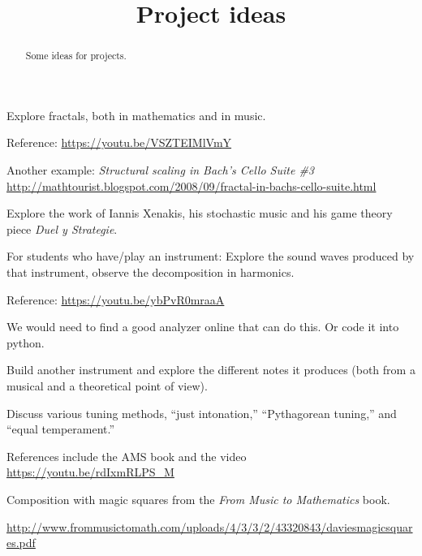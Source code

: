 \documentclass[12pt,noauthor,nooutcomes]{ximera}%
\author{}
\title{Project ideas}
\begin{document}
\begin{abstract}
    Some ideas for projects.
\end{abstract}
\maketitle

\begin{project}
Explore fractals, both in mathematics and in music.

Reference: \url{https://youtu.be/VSZTEIMlVmY}

Another example: \textit{Structural scaling in Bach's Cello Suite \#3} \url{http://mathtourist.blogspot.com/2008/09/fractal-in-bachs-cello-suite.html}
\end{project}

\begin{project}
Explore the work of Iannis Xenakis, his stochastic music and his game theory piece \textit{Duel y Strategie}.
\end{project}

\begin{project}
For students who have/play an instrument: Explore the sound waves produced by that instrument, observe the decomposition in harmonics.

Reference: \url{https://youtu.be/ybPvR0mraaA}

We would need to find a good analyzer online that can do this. Or code it into python.

\end{project}

\begin{project}
Build another instrument and explore the different notes it produces (both from a musical and a theoretical point of view).
\end{project}

\begin{project}
Discuss various tuning methods, ``just intonation,''  ``Pythagorean tuning,'' and ``equal temperament.''

References include the AMS book and the video
\url{https://youtu.be/rdIxmRLPS_M}
\end{project}

\begin{project}
Composition with magic squares from the \textit{From Music to Mathematics} book.

\url{http://www.frommusictomath.com/uploads/4/3/3/2/43320843/daviesmagicsquares.pdf}
\end{project}
\end{document}
